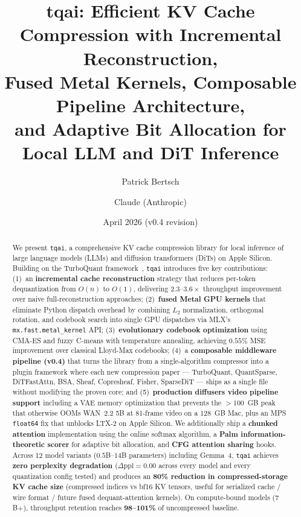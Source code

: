 \documentclass[11pt,a4paper]{article}
\title{%
  \textbf{tqai: Efficient KV Cache Compression with Incremental Reconstruction,\\
  Fused Metal Kernels, Composable Pipeline Architecture,\\
  and Adaptive Bit Allocation for Local LLM and DiT Inference}%
}
\author{
  Patrick Bertsch \and Claude (Anthropic)
}
\date{April 2026 (v0.4 revision)}
\begin{document}
\maketitle

\begin{abstract}
We present \texttt{tqai}, a comprehensive KV cache compression library for local inference of large language models (LLMs) and diffusion transformers (DiTs) on Apple Silicon. Building on the TurboQuant framework~\cite{zandieh2026turboquant}, \texttt{tqai} introduces five key contributions:
(1)~an \textbf{incremental cache reconstruction} strategy that reduces per-token dequantization from $O(n)$ to $O(1)$, delivering $2.3$--$3.6\times$ throughput improvement over naive full-reconstruction approaches;
(2)~\textbf{fused Metal GPU kernels} that eliminate Python dispatch overhead by combining $L_2$ normalization, orthogonal rotation, and codebook search into single GPU dispatches via MLX's \texttt{mx.fast.metal\_kernel} API;
(3)~\textbf{evolutionary codebook optimization} using CMA-ES and fuzzy C-means with temperature annealing, achieving $0.55\%$ MSE improvement over classical Lloyd-Max codebooks;
(4)~a \textbf{composable middleware pipeline (v0.4)} that turns the library from a single-algorithm compressor into a plugin framework where each new compression paper --- TurboQuant, QuantSparse, DiTFastAttn, BSA, Sheaf, Copresheaf, Fisher, SparseDiT --- ships as a single file without modifying the proven core;
and (5)~\textbf{production diffusers video pipeline support} including a VAE memory optimization that prevents the ${>}100$~GB peak that otherwise OOMs WAN~2.2 5B at 81-frame video on a 128~GB Mac, plus an MPS \texttt{float64} fix that unblocks LTX-2 on Apple Silicon.
We additionally ship a \textbf{chunked attention} implementation using the online softmax algorithm, a \textbf{Palm information-theoretic scorer} for adaptive bit allocation, and \textbf{CFG attention sharing} hooks.
Across 12 model variants ($0.5$B--$14$B parameters) including Gemma~4, \texttt{tqai} achieves \textbf{zero perplexity degradation} ($\Delta\text{ppl} = 0.00$ across every model and every quantization config tested) and produces an \textbf{80\% reduction in compressed-storage KV cache size} (compressed indices vs bf16 KV tensors, useful for serialized cache / wire format / future fused dequant-attention kernels).
On compute-bound models ($7$B+), throughput retention reaches \textbf{98--101\%} of uncompressed baseline.

\end{abstract}
\end{document}
